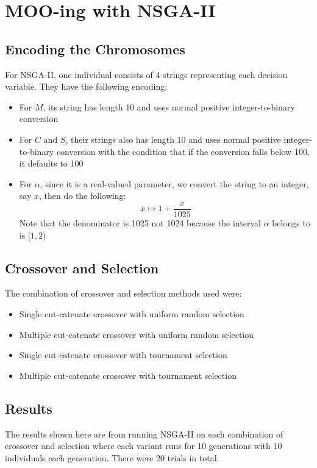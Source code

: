 \section{MOO-ing with NSGA-II}

\subsection{Encoding the Chromosomes}

For NSGA-II, one individual consists of 4 strings representing each decision variable. They have the following encoding: 
\begin{itemize}
    \item For \(M\), its string has length 10 and uses normal positive integer-to-binary conversion
    \item For \(C\) and \(S\), their strings also has length 10 and uses normal positive integer-to-binary conversion with the condition that if the conversion falls below 100, it defaults to 100
    \item For \(\alpha\), since it is a real-valued parameter, we convert the string to an integer, say \(x\), then do the following:
        \[
            x \mapsto 1 + \frac{x}{1025}
        \]
        Note that the denominator is 1025 not 1024 because the interval \(\alpha\) belongs to is \([1, 2)\)
\end{itemize}

\subsection{Crossover and Selection}

The combination of crossover and selection methods used were:
\begin{itemize}
    \item Single cut-catenate crossover with uniform random selection
    \item Multiple cut-catenate crossover with uniform random selection
    \item Single cut-catenate crossover with tournament selection
    \item Multiple cut-catenate crossover with tournament selection
\end{itemize}

\subsection{Results}

The results shown here are from running NSGA-II on each combination of crossover and selection where each variant runs for 10 generations with 10 individuals each generation. There were 20 trials in total.

